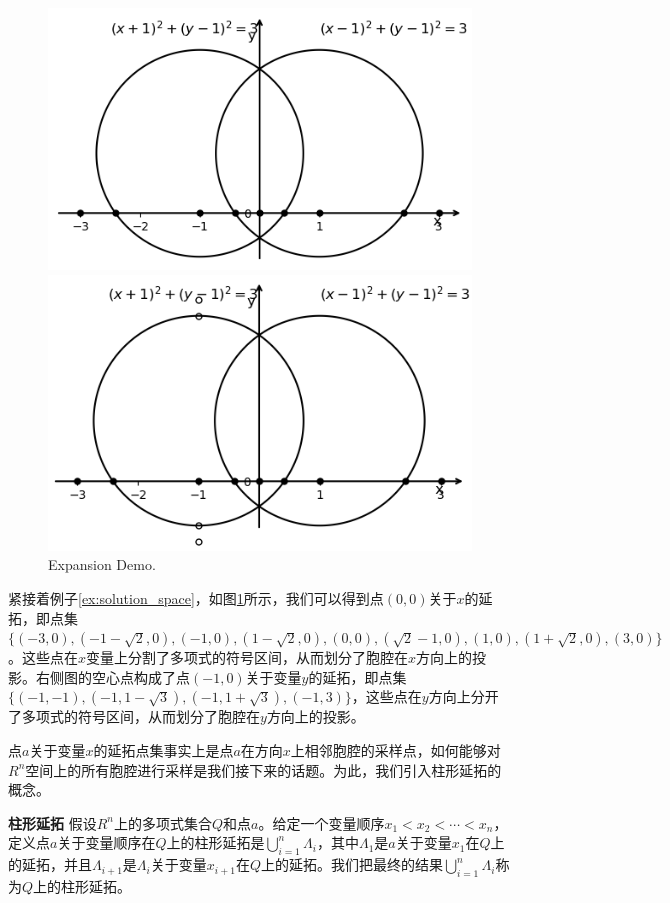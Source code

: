\begin{example}
\begin{figure}[]
    \centering
    \includegraphics[width=0.45\columnwidth]{Img/cell2.png} \qquad
    \includegraphics[width=0.45\columnwidth]{Img/cell3.png}
     {Expansion Demo.}
    \label{fig:expansion}
\end{figure}
紧接着例子\ref{ex:solution_space}，如图\ref{fig:expansion}所示，我们可以得到点$(0, 0)$关于$x$的延拓，即点集$\{(-3, 0), (-1-\sqrt{2}, 0), (-1, 0), (1-\sqrt{2}, 0), (0, 0), (\sqrt{2} - 1, 0), (1, 0), (1+\sqrt{2}, 0), (3, 0)\}$。这些点在$x$变量上分割了多项式的符号区间，从而划分了胞腔在$x$方向上的投影。右侧图的空心点构成了点$(-1, 0)$关于变量$y$的延拓，即点集$\{(-1, -1), (-1, 1-\sqrt{3}), (-1, 1+\sqrt{3}), (-1, 3)\}$，这些点在$y$方向上分开了多项式的符号区间，从而划分了胞腔在$y$方向上的投影。
\label{ex:expansion1}
\end{example}
点$a$关于变量$x$的延拓点集事实上是点$a$在方向$x$上相邻胞腔的采样点，如何能够对$R^n$空间上的所有胞腔进行采样是我们接下来的话题。为此，我们引入柱形延拓的概念。

\begin{definition}{\textbf{柱形延拓}}
假设$R^n$上的多项式集合$Q$和点$a$。给定一个变量顺序$x_1 < x_2 < \cdots < x_n$，定义点$a$关于变量顺序在$Q$上的柱形延拓是$\bigcup_{i=1}^n \Lambda_i$，其中$\Lambda_1$是$a$关于变量$x_1$在$Q$上的延拓，并且$\Lambda_{i+1}$是$\Lambda_i$关于变量$x_{i+1}$在$Q$上的延拓。我们把最终的结果$\bigcup_{i=1}^n \Lambda_i$称为$Q$上的柱形延拓。
\end{definition}

